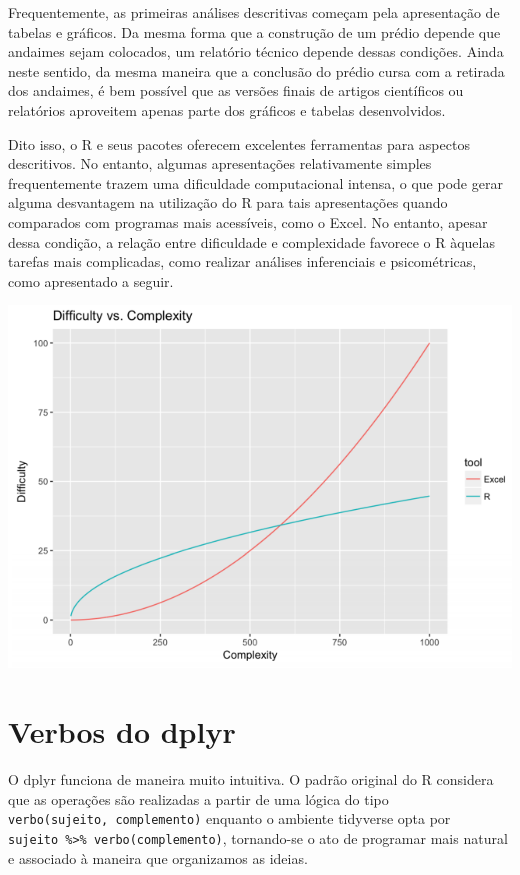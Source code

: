 \documentclass[
]{book}
\begin{document}
Frequentemente, as primeiras análises descritivas começam pela apresentação de tabelas e gráficos. Da mesma forma que a construção de um prédio depende que andaimes sejam colocados, um relatório técnico depende dessas condições. Ainda neste sentido, da mesma maneira que a conclusão do prédio cursa com a retirada dos andaimes, é bem possível que as versões finais de artigos científicos ou relatórios aproveitem apenas parte dos gráficos e tabelas desenvolvidos.

Dito isso, o R e seus pacotes oferecem excelentes ferramentas para aspectos descritivos. No entanto, algumas apresentações relativamente simples frequentemente trazem uma dificuldade computacional intensa, o que pode gerar alguma desvantagem na utilização do R para tais apresentações quando comparados com programas mais acessíveis, como o Excel. No entanto, apesar dessa condição, a relação entre dificuldade e complexidade favorece o R àquelas tarefas mais complicadas, como realizar análises inferenciais e psicométricas, como apresentado a seguir.

\includegraphics{./img/excel_r.PNG}

\hypertarget{verbos-do-dplyr}{%
\section{Verbos do dplyr}\label{verbos-do-dplyr}}

O dplyr funciona de maneira muito intuitiva. O padrão original do R considera que as operações são realizadas a partir de uma lógica do tipo \texttt{verbo(sujeito,\ complemento)} enquanto o ambiente tidyverse opta por \texttt{sujeito\ \%\textgreater{}\%\ verbo(complemento)}, tornando-se o ato de programar mais natural e associado à maneira que organizamos as ideias.
\end{document}
